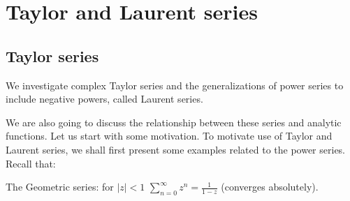 
% 
% 
% 
% 
% 
% 
% 
% 
% 
% 
% 

\graphicspath{{./input/graphs/note06/}}


% 



\section{Taylor and Laurent series}

\subsection{Taylor series}
We investigate complex Taylor series and the generalizations of power series to include negative powers, called Laurent series.

We are also going to discuss the relationship between these series and analytic functions. Let us start with some motivation. To motivate use of Taylor and Laurent series, we shall first present some examples related to the power series. Recall that:

The Geometric series: for $|z| < 1$ $\sum_{n=0}^{\infty} z^n = \frac{1}{1-z}$ (converges absolutely).


